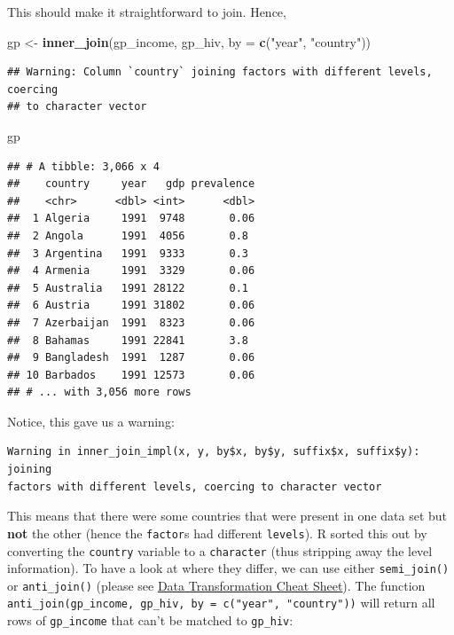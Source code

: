 \documentclass[]{book}
\newenvironment{Shaded}{\begin{snugshade}}{\end{snugshade}}
\newcommand{\KeywordTok}[1]{\textcolor[rgb]{0.13,0.29,0.53}{\textbf{{#1}}}}
\newcommand{\DataTypeTok}[1]{\textcolor[rgb]{0.13,0.29,0.53}{{#1}}}
\newcommand{\StringTok}[1]{\textcolor[rgb]{0.31,0.60,0.02}{{#1}}}
\newcommand{\NormalTok}[1]{{#1}}
\theoremstyle{definition}
\theoremstyle{definition}
\theoremstyle{definition}
\theoremstyle{remark}
\begin{document}
This should make it straightforward to join. Hence,

\begin{Shaded}
\begin{Highlighting}[]
\NormalTok{gp <-}\StringTok{ }\KeywordTok{inner_join}\NormalTok{(gp_income, gp_hiv, }\DataTypeTok{by =} \KeywordTok{c}\NormalTok{(}\StringTok{"year"}\NormalTok{, }\StringTok{"country"}\NormalTok{))}
\end{Highlighting}
\end{Shaded}

\begin{verbatim}
## Warning: Column `country` joining factors with different levels, coercing
## to character vector
\end{verbatim}

\begin{Shaded}
\begin{Highlighting}[]
\NormalTok{gp}
\end{Highlighting}
\end{Shaded}

\begin{verbatim}
## # A tibble: 3,066 x 4
##    country     year   gdp prevalence
##    <chr>      <dbl> <int>      <dbl>
##  1 Algeria     1991  9748       0.06
##  2 Angola      1991  4056       0.8 
##  3 Argentina   1991  9333       0.3 
##  4 Armenia     1991  3329       0.06
##  5 Australia   1991 28122       0.1 
##  6 Austria     1991 31802       0.06
##  7 Azerbaijan  1991  8323       0.06
##  8 Bahamas     1991 22841       3.8 
##  9 Bangladesh  1991  1287       0.06
## 10 Barbados    1991 12573       0.06
## # ... with 3,056 more rows
\end{verbatim}

Notice, this gave us a warning:

\begin{verbatim}
Warning in inner_join_impl(x, y, by$x, by$y, suffix$x, suffix$y): joining
factors with different levels, coercing to character vector
\end{verbatim}

This means that there were some countries that were present in one data
set but \textbf{not} the other (hence the \texttt{factor}s had different
\texttt{levels}). R sorted this out by converting the \texttt{country}
variable to a \texttt{character} (thus stripping away the level
information). To have a look at where they differ, we can use either
\texttt{semi\_join()} or \texttt{anti\_join()} (please see
\href{https://github.com/rstudio/cheatsheets/raw/master/source/pdfs/data-transformation-cheatsheet.pdf}{Data
Transformation Cheat Sheet}). The function
\texttt{anti\_join(gp\_income,\ gp\_hiv,\ by\ =\ c("year",\ "country"))}
will return all rows of \texttt{gp\_income} that can't be matched to
\texttt{gp\_hiv}:
\end{document}
